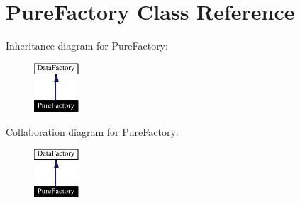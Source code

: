 \hypertarget{classPureFactory}{
\section{Pure\-Factory  Class Reference}
\label{classPureFactory}
}
Inheritance diagram for Pure\-Factory:\begin{figure}[H]
\begin{center}
\leavevmode
\includegraphics[width=47pt]{classPureFactory__inherit__graph}
\end{center}
\end{figure}
Collaboration diagram for Pure\-Factory:\begin{figure}[H]
\begin{center}
\leavevmode
\includegraphics[width=47pt]{classPureFactory__coll__graph}
\end{center}
\end{figure}
